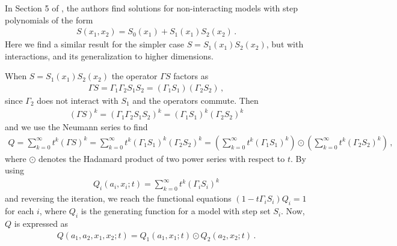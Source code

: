 In Section 5 of \cite[p.~14]{bostan2014three}, the authors find solutions for non-interacting models with step polynomials of the form
\begin{align}
	S(x_1,x_2) = S_0(x_1) + S_1(x_1)S_2(x_2)\,.
\end{align} 
Here we find a similar result for the simpler case $S = S_1(x_1)S_2(x_2)$, but with interactions, and its generalization to higher dimensions.
\begin{exa} When $S = S_1(x_1)S_2(x_2)$ the operator $\Gamma S$ factors as
\begin{align}
	 \Gamma S = \Gamma_1\Gamma_2S_1S_2 = (\Gamma_1S_1)(\Gamma_2S_2)\,,
\end{align}
since $\Gamma_2$ does not interact with $S_1$ and the operators commute. Then
\begin{align}
	 (\Gamma S)^k = (\Gamma_1\Gamma_2S_1S_2)^k = (\Gamma_1S_1)^k(\Gamma_2S_2)^k
\end{align}
and we use the Neumann series to find
\begin{align}
	Q = \sum_{k = 0}^{\infty} t^k (\Gamma S)^k = \sum_{k = 0}^{\infty} t^k (\Gamma_1S_1)^k(\Gamma_2S_2)^k = \left(\sum_{k = 0}^{\infty} t^k (\Gamma_1S_1)^k\right) \odot  \left(\sum_{k = 0}^{\infty} t^k (\Gamma_2S_2)^k\right)\,,
\end{align}
where $\odot$ denotes the Hadamard product of two power series with respect to $t$. By using
\begin{align}
	Q_i(a_i,x_i;t)= \sum_{k = 0}^{\infty} t^k (\Gamma_i S_i)^k
\end{align}
and reversing the iteration, we reach the functional equations $(1-t\Gamma_i S_i)Q_i = 1$ for each $i$, where $Q_i$ is the generating function for a \oneD model with step set $S_i$. Now, $Q$ is expressed as
\begin{align}
	Q(a_1,a_2,x_1,x_2;t) = Q_1(a_1,x_1;t) \odot Q_2(a_2,x_2;t)\,.
\end{align}
\end{exa}

